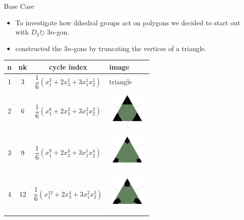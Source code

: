 \documentclass{beamer}
\begin{document}
\begin{frame}{Base Case}
	\begin{itemize}
    	\item To investigate how dihedral groups act on polygons we decided to start out with $D_3  				\circlearrowright$ $3n$-gon.\\
    	\item constructed the $3n$-gons by truncating the vertices of a triangle.
	\end{itemize}
\end{frame}
\begin{frame}
	\begin{table}
	\centering
		\begin{tabular}{c|c|c|l}
			n & nk & cycle index & image\\\hline
			1& 3& $\dfrac{1}{6}(x_1^3+2x_3^1+3x_1^1 x_2^1)$ & triangle \\\hline
			2 & 6 & $\dfrac{1}{6}(x_1^6+2x_3^2+3x_1^2x_2^2)$ & 			\includegraphics[width=2cm]{newtriangle_copya}\\\hline
			3 & 9 & $\dfrac{1}{6}(x_1^9+2x_3^3+3x_1^1x_2^4)$ & \includegraphics[width=2cm]{newtriangle_copy9}\\\hline
			4 & 12 & $\dfrac{1}{6}(x_1^{12}+2x_3^4+3x_1^2x_2^5)$ & \includegraphics[width=2cm]{newtriangle_copy12}\\\hline
		\end{tabular}
	\end{table}
\end{frame}
\end{document}
